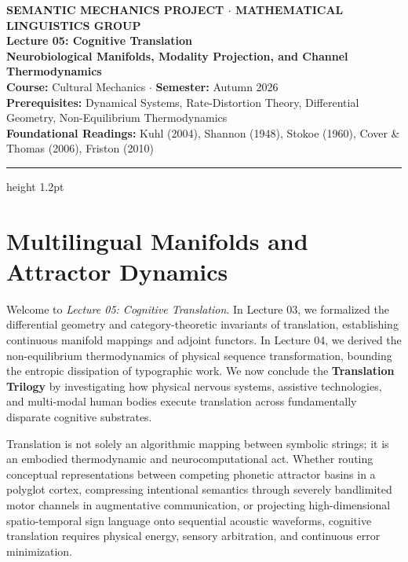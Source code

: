 \documentclass[11pt,letterpaper]{article}
\begin{document}
\begin{center}
    {\small\sffamily\bfseries\color{darkslate} SEMANTIC MECHANICS PROJECT $\cdot$ MATHEMATICAL LINGUISTICS GROUP}\\[0.7em]
    {\LARGE\bfseries\color{primaryblue} Lecture 05: Cognitive Translation}\\[0.35em]
    {\large\bfseries\color{primaryblue} Neurobiological Manifolds, Modality Projection, and Channel Thermodynamics}\\[0.4em]
    {\normalsize\sffamily\color{darkslate} \textbf{Course:} Cultural Mechanics $\cdot$ \textbf{Semester:} Autumn 2026}\\[0.25em]
    {\small\sffamily\color{darkslate!80} \textbf{Prerequisites:} Dynamical Systems, Rate-Distortion Theory, Differential Geometry, Non-Equilibrium Thermodynamics}\\[0.25em]
    {\small\sffamily\color{darkslate!80} \textbf{Foundational Readings:} Kuhl (2004), Shannon (1948), Stokoe (1960), Cover \& Thomas (2006), Friston (2010)}
\end{center}
\vspace{0.1em}
\hrule height 1.2pt \vspace{0.7em}

\section{Multilingual Manifolds and Attractor Dynamics}

Welcome to \textit{Lecture 05: Cognitive Translation}. In Lecture 03, we formalized the differential geometry and category-theoretic invariants of translation, establishing continuous manifold mappings and adjoint functors. In Lecture 04, we derived the non-equilibrium thermodynamics of physical sequence transformation, bounding the entropic dissipation of typographic work. We now conclude the \textbf{Translation Trilogy} by investigating how physical nervous systems, assistive technologies, and multi-modal human bodies execute translation across fundamentally disparate cognitive substrates.

Translation is not solely an algorithmic mapping between symbolic strings; it is an embodied thermodynamic and neurocomputational act. Whether routing conceptual representations between competing phonetic attractor basins in a polyglot cortex, compressing intentional semantics through severely bandlimited motor channels in augmentative communication, or projecting high-dimensional spatio-temporal sign language onto sequential acoustic waveforms, cognitive translation requires physical energy, sensory arbitration, and continuous error minimization.
\end{document}
